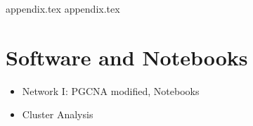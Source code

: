 \newpage

\begin{appendices}

{appendix.tex}
{appendix.tex}

\chapter{Software and Notebooks} \label{s:ap:software}

\begin{itemize}
    \item Network I: PGCNA modified, Notebooks
    \item Cluster Analysis
\end{itemize}

\end{appendices}
